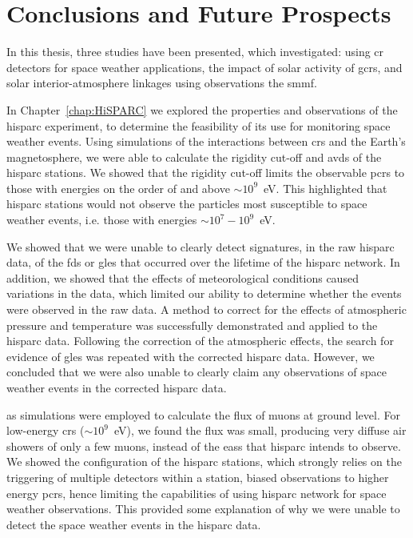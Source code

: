 \chapter{Conclusions and Future Prospects}\label{chap:conc}

In this thesis, three studies have been presented, which investigated: using \gls{cr} detectors for space weather applications, the impact of solar activity of \glspl{gcr}, and solar interior-atmosphere linkages using observations the \gls{smmf}. %

In Chapter~\ref{chap:HiSPARC} we explored the properties and observations of the \gls{hisparc} experiment, to determine the feasibility of its use for monitoring space weather events. Using simulations of the interactions between \glspl{cr} and the Earth's magnetosphere, we were able to calculate the rigidity cut-off and \glspl{avd} of the \gls{hisparc} stations. We showed that the rigidity cut-off limits the observable \glspl{pcr} to those with energies on the order of and above $\sim 10^9$~eV. This highlighted that \gls{hisparc} stations would not observe the particles most susceptible to space weather events, i.e. those with energies $\sim 10^7-10^9$~eV.

We showed that we were unable to clearly detect signatures, in the raw \gls{hisparc} data, of the \glspl{fd} or \glspl{gle} that occurred over the lifetime of the \gls{hisparc} network. In addition, we showed that the effects of meteorological conditions caused variations in the data, which limited our ability to determine whether the events were observed in the raw data. A method to correct for the effects of atmospheric pressure and temperature was successfully demonstrated and applied to the \gls{hisparc} data. Following the correction of the atmospheric effects, the search for evidence of \glspl{gle} was repeated with the corrected \gls{hisparc} data. However, we concluded that we were also unable to clearly claim any observations of space weather events in the corrected \gls{hisparc} data.

\gls{as} simulations were employed to calculate the flux of muons at ground level. For low-energy \glspl{cr} ($\sim 10^9$~eV), we found the flux was small, producing very diffuse air showers of only a few muons, instead of the \glspl{eas} that \gls{hisparc} intends to observe. We showed the configuration of the \gls{hisparc} stations, which strongly relies on the triggering of multiple detectors within a station, biased observations to higher energy \glspl{pcr}, hence limiting the capabilities of using \gls{hisparc} network for space weather observations. This provided some explanation of why we were unable to detect the space weather events in the \gls{hisparc} data.

